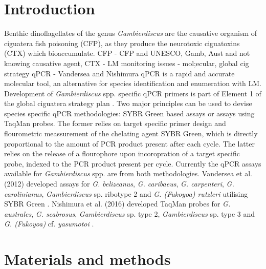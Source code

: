 \documentclass[12pt]{article}
\begin{document}
\section{Introduction}
Benthic dinoflagellates of the genus \emph{Gambierdiscus} are the causative organism of ciguatera fish poisoning (CFP), as they produce the neurotoxic ciguatoxins (CTX) which bioaccumulate. CFP 
- CFP and UNESCO, Gamb, Aust and not knowing causative agent, CTX
- LM monitoring issues - mol;ecular, global cig strategy qPCR
- Vandersea and Nishimura
qPCR is a rapid and accurate molecular tool, an alternative for species identification and enumeration with LM. Development of \emph{Gambierdiscus} spp. specific qPCR primers is part of Element 1 of the global ciguatera strategy plan \cite{globalcig}. Two major principles can be used to devise species specific qPCR methodologies: SYBR Green based assays or assays using TaqMan probes. The former relies on target specific primer design and flourometric meassurement of the chelating agent SYBR Green, which is directly proportional to the amount of PCR product present after each cycle. The latter relies on the release of a flourophore upon incoropration of a target specific probe, indexed to the PCR product present per cycle. Currently the qPCR assays available for  \emph{Gambierdiscus} spp. are from both methodologies. Vandersea et al. (2012) developed assays for \emph{G. belizeanus}, \emph{G. caribaeus}, \emph{G. carpenteri}, \emph{G. carolinianus}, \emph{Gambierdiscus} sp. ribotype 2 and \emph{G. (Fukoyoa) rutzleri} utilising SYBR Green \cite{vandersea2012development}. Nishimura et al. (2016) developed TaqMan probes for  \emph{G. australes}, \emph{G. scabrosus}, \emph{Gambierdiscus} sp. type 2, \emph{Gambierdiscus} sp. type 3 and \emph{G. (Fukoyoa)} cf. \emph{yasumotoi} \cite{nishimura2016quantitative}.
\newpage
\section{Materials and methods}
\end{document}
